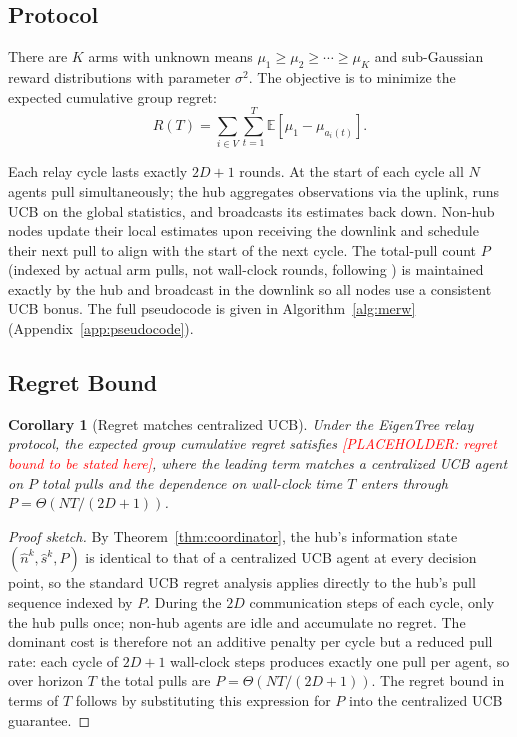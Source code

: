 \documentclass{article}
\newtheorem{corollary}{Corollary}
\newcommand{\merw}{EigenTree}
\begin{document}
\subsection{Protocol}

There are $K$ arms with unknown means $\mu_1 \geq \mu_2 \geq \cdots \geq \mu_K$ and sub-Gaussian reward distributions with parameter $\sigma^2$. The objective is to minimize the expected cumulative group regret:
\[
R(T) = \sum_{i \in V} \sum_{t=1}^{T} \mathbb{E}[\mu_1 - \mu_{a_i(t)}].
\]

Each relay cycle lasts exactly $2D + 1$ rounds. At the start of each cycle all $N$ agents pull simultaneously; the hub aggregates observations via the uplink, runs UCB on the global statistics, and broadcasts its estimates back down. Non-hub nodes update their local estimates upon receiving the downlink and schedule their next pull to align with the start of the next cycle. The total-pull count $P$ (indexed by actual arm pulls, not wall-clock rounds, following \cite{martinez2019decentralized}) is maintained exactly by the hub and broadcast in the downlink so all nodes use a consistent UCB bonus. The full pseudocode is given in Algorithm~\ref{alg:merw} (Appendix~\ref{app:pseudocode}).

\subsection{Regret Bound}

\begin{corollary}[Regret matches centralized UCB]
\label{cor:regret}
Under the \merw{} relay protocol, the expected group cumulative regret satisfies \textcolor{red}{[PLACEHOLDER: regret bound to be stated here]}, where the leading term matches a centralized UCB agent on $P$ total pulls and the dependence on wall-clock time $T$ enters through $P = \Theta(NT/(2D+1))$.
\end{corollary}

\begin{proof}[Proof sketch]
By Theorem~\ref{thm:coordinator}, the hub's information state $(\hat{n}^k, \hat{s}^k, P)$ is identical to that of a centralized UCB agent at every decision point, so the standard UCB regret analysis applies directly to the hub's pull sequence indexed by $P$. During the $2D$ communication steps of each cycle, only the hub pulls once; non-hub agents are idle and accumulate no regret. The dominant cost is therefore not an additive penalty per cycle but a reduced pull rate: each cycle of $2D+1$ wall-clock steps produces exactly one pull per agent, so over horizon $T$ the total pulls are $P = \Theta(NT/(2D+1))$. The regret bound in terms of $T$ follows by substituting this expression for $P$ into the centralized UCB guarantee.
\end{proof}
\end{document}
